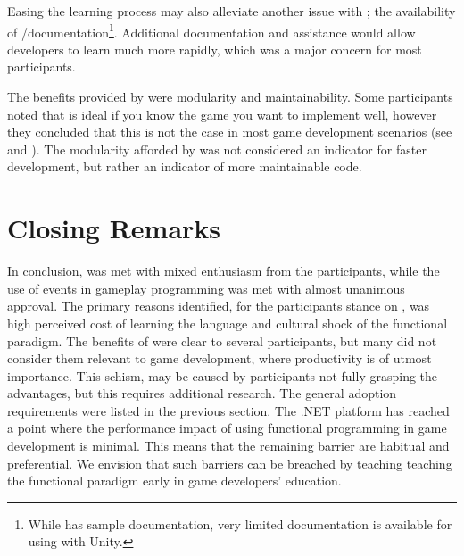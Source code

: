 Easing the learning process may also alleviate another issue with \fs; the availability of \unity/\fs documentation\footnote{While \fs has sample documentation, very limited documentation is available for using \fs with Unity.}. Additional documentation and assistance would allow developers to learn much more rapidly, which was a major concern for most participants.

The benefits provided by \fs were modularity and maintainability. Some participants noted that \fs is ideal if you know the game you want to implement well, however they concluded that this is not the case in most game development scenarios (see  and ). The modularity afforded by \fs was not considered an indicator for faster development, but rather an indicator of more maintainable code.

\section{Closing Remarks}
In conclusion, \fs was met with mixed enthusiasm from the participants, while the use of events in gameplay programming was met with almost unanimous approval. The primary reasons identified, for the participants stance on \fs, was high perceived cost of learning the language and cultural shock of the functional paradigm. The benefits of \fs were clear to several participants, but many did not consider them relevant to game development, where productivity is of utmost importance. This schism, may be caused by participants not fully grasping the advantages, but this requires additional research. The general adoption requirements were listed in the previous section. The .NET platform has reached a point where the performance impact of using functional programming in game development is minimal. This means that the remaining barrier are habitual and preferential. We envision that such barriers can be breached by teaching teaching the functional paradigm early in game developers' education.